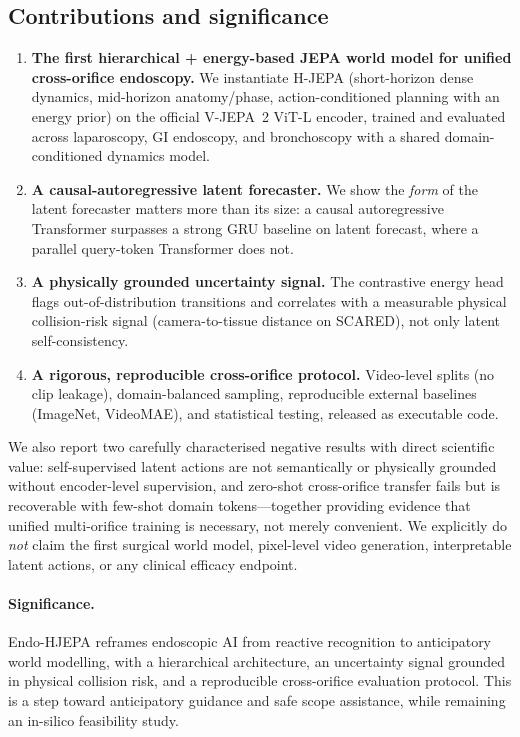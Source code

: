 \documentclass[final,3p,times,twocolumn]{elsarticle}
\begin{document}
\subsection{Contributions and significance}
\begin{enumerate}
  \item \textbf{The first hierarchical + energy-based JEPA world model for unified cross-orifice endoscopy.} We instantiate H-JEPA (short-horizon dense dynamics, mid-horizon anatomy/phase, action-conditioned planning with an energy prior) on the official V-JEPA~2 ViT-L encoder, trained and evaluated across laparoscopy, GI endoscopy, and bronchoscopy with a shared domain-conditioned dynamics model.
  \item \textbf{A causal-autoregressive latent forecaster.} We show the \emph{form} of the latent forecaster matters more than its size: a causal autoregressive Transformer surpasses a strong GRU baseline on latent forecast, where a parallel query-token Transformer does not.
  \item \textbf{A physically grounded uncertainty signal.} The contrastive energy head flags out-of-distribution transitions and correlates with a measurable physical collision-risk signal (camera-to-tissue distance on SCARED), not only latent self-consistency.
  \item \textbf{A rigorous, reproducible cross-orifice protocol.} Video-level splits (no clip leakage), domain-balanced sampling, reproducible external baselines (ImageNet, VideoMAE), and statistical testing, released as executable code.
\end{enumerate}

We also report two carefully characterised negative results with direct scientific value: self-supervised latent actions are not semantically or physically grounded without encoder-level supervision, and zero-shot cross-orifice transfer fails but is recoverable with few-shot domain tokens---together providing evidence that unified multi-orifice training is necessary, not merely convenient. We explicitly do \emph{not} claim the first surgical world model, pixel-level video generation, interpretable latent actions, or any clinical efficacy endpoint.

\paragraph{Significance.} Endo-HJEPA reframes endoscopic AI from reactive recognition to anticipatory world modelling, with a hierarchical architecture, an uncertainty signal grounded in physical collision risk, and a reproducible cross-orifice evaluation protocol. This is a step toward anticipatory guidance and safe scope assistance, while remaining an in-silico feasibility study.
\end{document}
